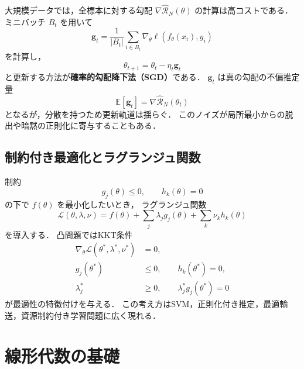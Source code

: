 大規模データでは，全標本に対する勾配
$\nabla \hat{\mathcal{R}}_{N}(\theta)$ の計算は高コストである．
ミニバッチ $B_{t}$ を用いて
\begin{equation}
  \boldsymbol{g}_{t}
  =
  \frac{1}{|B_{t}|}
  \sum_{i\in B_{t}}
  \nabla_{\theta}\ell(f_{\theta}(x_i), y_i)
  \label{eq:minibatch-gradient}
\end{equation}
を計算し，
\begin{equation}
  \theta_{t+1} = \theta_{t} - \eta_{t}\boldsymbol{g}_{t}
  \label{eq:sgd}
\end{equation}
と更新する方法が\textbf{確率的勾配降下法（SGD）}である\cite{RobbinsMonro1951}．
$\boldsymbol{g}_{t}$ は真の勾配の不偏推定量
\begin{equation}
  \mathbb{E}[\boldsymbol{g}_{t}] = \nabla \hat{\mathcal{R}}_{N}(\theta_{t})
  \label{eq:unbiased-gradient}
\end{equation}
となるが，分散を持つため更新軌道は揺らぐ．
このノイズが局所最小からの脱出や暗黙の正則化に寄与することもある．

\subsection{制約付き最適化とラグランジュ関数}

制約
\begin{equation}
  g_{j}(\theta)\leq 0,
  \qquad
  h_{k}(\theta)=0
  \label{eq:constraints}
\end{equation}
の下で $f(\theta)$ を最小化したいとき，
ラグランジュ関数
\begin{equation}
  \mathcal{L}(\theta,\lambda,\nu)
  =
  f(\theta)
  +
  \sum_{j}\lambda_{j}g_{j}(\theta)
  +
  \sum_{k}\nu_{k}h_{k}(\theta)
  \label{eq:lagrangian}
\end{equation}
を導入する．
凸問題ではKKT条件
\begin{align}
  \nabla_{\theta}\mathcal{L}(\theta^{\ast},\lambda^{\ast},\nu^{\ast}) &= 0,
  \label{eq:kkt-stationarity}
  \\
  g_{j}(\theta^{\ast}) &\leq 0,
  \qquad
  h_{k}(\theta^{\ast}) = 0,
  \label{eq:kkt-feasibility}
  \\
  \lambda_{j}^{\ast} &\geq 0,
  \qquad
  \lambda_{j}^{\ast}g_{j}(\theta^{\ast}) = 0
  \label{eq:kkt-complementary}
\end{align}
が最適性の特徴付けを与える．
この考え方はSVM，正則化付き推定，最適輸送，資源制約付き学習問題に広く現れる．

\section{線形代数の基礎}
\label{sec:ml-linear-algebra}

